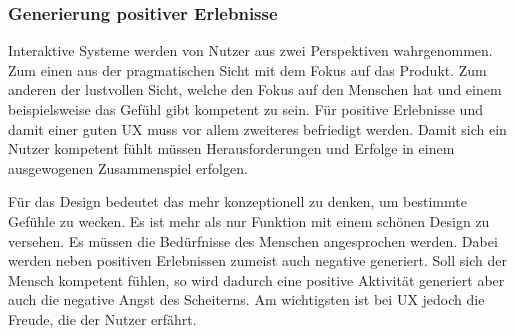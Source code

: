 \subsubsection*{Generierung positiver Erlebnisse}
Interaktive Systeme werden von Nutzer aus zwei Perspektiven wahrgenommen. Zum einen aus der pragmatischen Sicht mit dem Fokus auf das Produkt. Zum anderen der lustvollen Sicht, welche den Fokus auf den Menschen hat und einem beispielsweise das Gefühl gibt kompetent zu sein. Für positive Erlebnisse und damit einer guten UX muss vor allem zweiteres befriedigt werden. Damit sich ein Nutzer kompetent fühlt müssen Herausforderungen und Erfolge in einem ausgewogenen Zusammenspiel erfolgen.

Für das Design bedeutet das mehr konzeptionell zu denken, um bestimmte Gefühle zu wecken. Es ist mehr als nur Funktion mit einem schönen Design zu versehen. Es müssen die Bedürfnisse des Menschen angesprochen werden. Dabei werden neben positiven Erlebnissen zumeist auch negative generiert. Soll sich der Mensch kompetent fühlen, so wird dadurch eine positive Aktivität generiert aber auch die negative Angst des Scheiterns. Am wichtigsten ist bei UX jedoch die Freude, die der Nutzer erfährt.


